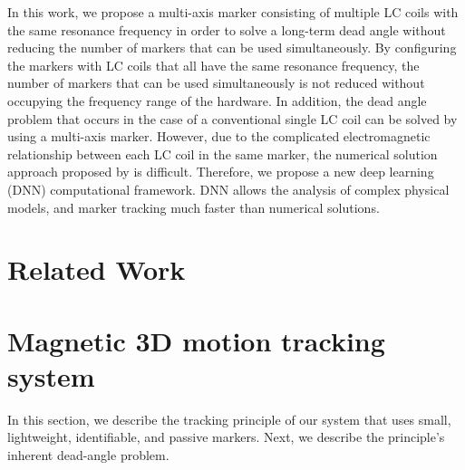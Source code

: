 \documentclass[journal,twoside,web]{ieeecolor}
\begin{document}
In this work, we propose a multi-axis marker consisting of multiple LC coils with the same resonance frequency in order to solve a long-term dead angle without reducing the number of markers that can be used simultaneously. By configuring the markers with LC coils that all have the same resonance frequency, the number of markers that can be used simultaneously is not reduced without occupying the frequency range of the hardware. In addition, the dead angle problem that occurs in the case of a conventional single LC coil can be solved by using a multi-axis marker. However, due to the complicated electromagnetic relationship between each LC coil in the same marker, the numerical solution approach proposed by \cite {im6d} is difficult. Therefore, we propose a new deep learning (DNN) computational framework. DNN allows the analysis of complex physical models, and marker tracking much faster than numerical solutions.

\section{Related Work}


\section{Magnetic 3D motion tracking system}
\label{overview}
In this section, we describe the tracking principle of our system that uses small, lightweight, identifiable, and passive markers. Next, we describe the principle’s inherent dead-angle problem.
\end{document}
